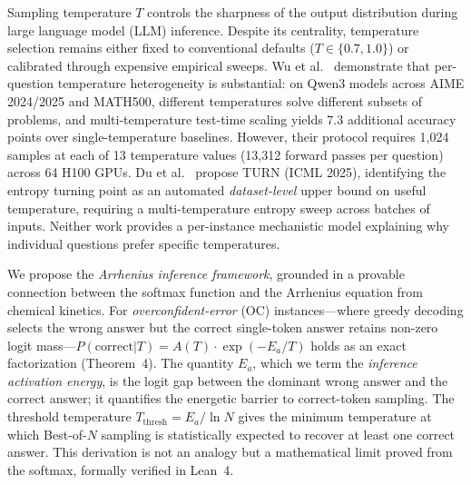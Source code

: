 \documentclass[11pt,letterpaper,twocolumn]{article}
\begin{document}
Sampling temperature $T$ controls the sharpness of the output distribution during large
language model (LLM) inference. Despite its centrality, temperature selection remains
either fixed to conventional defaults ($T \in \{0.7, 1.0\}$) or calibrated through
expensive empirical sweeps. Wu et al.~\cite{Wu2025} demonstrate that per-question
temperature heterogeneity is substantial: on Qwen3 models across AIME 2024/2025 and
MATH500, different temperatures solve different subsets of problems, and multi-temperature
test-time scaling yields 7.3 additional accuracy points over single-temperature baselines.
However, their protocol requires 1,024 samples at each of 13 temperature values (13,312
forward passes per question) across 64 H100 GPUs. Du et al.~\cite{Du2025} propose TURN
(ICML 2025), identifying the entropy turning point as an automated \emph{dataset-level}
upper bound on useful temperature, requiring a multi-temperature entropy sweep across
batches of inputs. Neither work provides a per-instance mechanistic model explaining why
individual questions prefer specific temperatures.

We propose the \emph{Arrhenius inference framework}, grounded in a provable connection
between the softmax function and the Arrhenius equation from chemical kinetics. For
\emph{overconfident-error} (OC) instances---where greedy decoding selects the wrong
answer but the correct single-token answer retains non-zero logit mass---$P(\text{correct}|T)
= A(T) \cdot \exp(-E_a/T)$ holds as an exact factorization (Theorem~4). The quantity
$E_a$, which we term the \emph{inference activation energy}, is the logit gap between
the dominant wrong answer and the correct answer; it quantifies the energetic barrier to
correct-token sampling. The threshold temperature $T_\text{thresh} = E_a / \ln N$ gives
the minimum temperature at which Best-of-$N$ sampling is statistically expected to
recover at least one correct answer. This derivation is not an analogy but a mathematical
limit proved from the softmax, formally verified in Lean~4.
\end{document}
